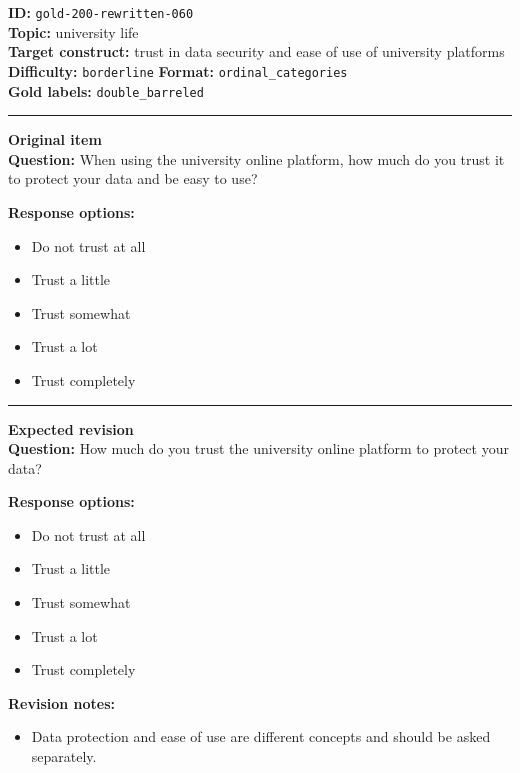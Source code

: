 \documentclass[10pt,a4paper]{article}
\newcommand{\sectionline}{\vspace{0.15em}\hrule\vspace{0.35em}}
\begin{document}
\begin{tcolorbox}[colframe=FlawRed,colback=white,colbacktitle=FlawRed!9,coltitle=black,title={Item 060\hfill Flawed item}]
\textbf{ID:} \texttt{gold-200-rewritten-060}\\
\textbf{Topic:} university life\\
\textbf{Target construct:} trust in data security and ease of use of university platforms\\
\textbf{Difficulty:} \texttt{borderline} \quad \textbf{Format:} \texttt{ordinal\_categories}\\
\textbf{Gold labels:} \texttt{double\_barreled}\\
\sectionline
\textbf{Original item}\\
\textbf{Question:} When using the university online platform, how much do you trust it to protect your data and be easy to use?
\par\textbf{Response options:}
\begin{itemize}
\item Do not trust at all
\item Trust a little
\item Trust somewhat
\item Trust a lot
\item Trust completely
\end{itemize}
\sectionline
\textbf{Expected revision}\\
\textbf{Question:} How much do you trust the university online platform to protect your data?
\par\textbf{Response options:}
\begin{itemize}
\item Do not trust at all
\item Trust a little
\item Trust somewhat
\item Trust a lot
\item Trust completely
\end{itemize}
\par\textbf{Revision notes:}
\begin{itemize}
\item Data protection and ease of use are different concepts and should be asked separately.
\end{itemize}
\end{tcolorbox}
\end{document}
